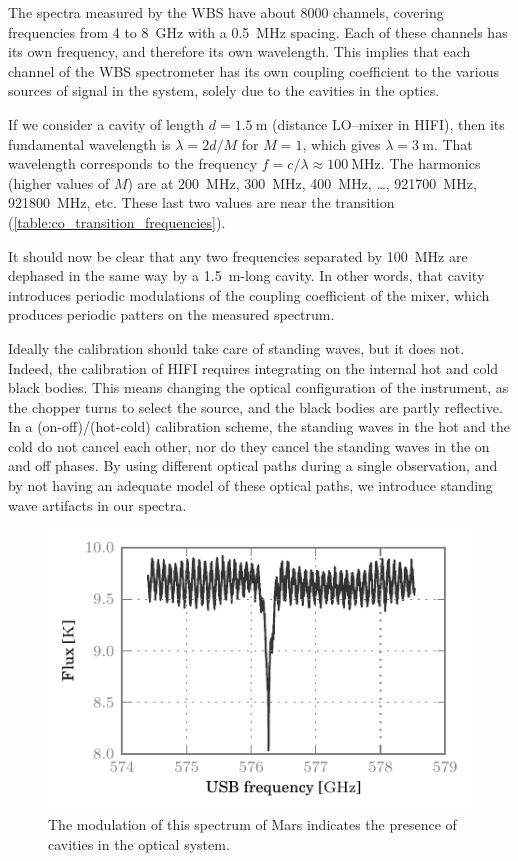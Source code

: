 The spectra measured by the WBS have about 8000 channels, covering frequencies from 4 to \SI{8}{\giga\hertz} with a \SI{0.5}{\mega\hertz} spacing.
Each of these channels has its own frequency, and therefore its own wavelength.
This implies that each channel of the WBS spectrometer has its own coupling coefficient to the various sources of signal in the system, solely due to the cavities in the optics.

If we consider a cavity of length $d=\SI{1.5}{\meter}$ (distance LO--mixer in HIFI), then its fundamental wavelength is $\lambda=2d/M$ for $M=1$, which gives $\lambda=\SI{3}{\meter}$.
That wavelength corresponds to the frequency $f=c/\lambda \approx \SI{100}{\mega\hertz}$.
The harmonics (higher values of $M$) are at \SI{200}{\mega\hertz}, \SI{300}{\mega\hertz}, \SI{400}{\mega\hertz}, \ldots, \SI{921700}{\mega\hertz}, \SI{921800}{\mega\hertz}, etc.  These last two values are near the  transition (\cref{table:co_transition_frequencies}).

It should now be clear that any two frequencies separated by \SI{100}{\mega\hertz} are dephased in the same way by a \SI{1.5}{\meter}-long cavity.
In other words, that cavity introduces periodic modulations of the coupling coefficient of the mixer, which produces periodic patters on the measured spectrum.

Ideally the calibration should take care of standing waves, but it does not.
Indeed, the calibration of HIFI requires integrating on the internal hot and cold black bodies.
This means changing the optical configuration of the instrument, as the chopper turns to select the source, and the black bodies are partly reflective.
In a (on-off)/(hot-cold) calibration scheme, the standing waves in the hot and the cold do not cancel each other, nor do they cancel the standing waves in the on and off phases.
By using different optical paths during a single observation, and by not having an adequate model of these optical paths, we introduce standing wave artifacts in our spectra.

\begin{figure}[htbp]
    \centering
    \includegraphics{mars_50010cb7_WBSH_USB}
    \caption{
        The modulation of this spectrum of Mars indicates the presence of cavities in the optical system.
    }
    \label{fig:mars}
\end{figure}

